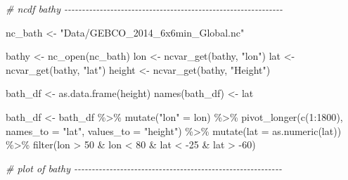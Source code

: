 \documentclass[
]{article}
\newenvironment{Shaded}{\begin{snugshade}}{\end{snugshade}}
\newcommand{\AttributeTok}[1]{\textcolor[rgb]{0.77,0.63,0.00}{#1}}
\newcommand{\CommentTok}[1]{\textcolor[rgb]{0.56,0.35,0.01}{\textit{#1}}}
\newcommand{\DecValTok}[1]{\textcolor[rgb]{0.00,0.00,0.81}{#1}}
\newcommand{\FunctionTok}[1]{\textcolor[rgb]{0.00,0.00,0.00}{#1}}
\newcommand{\NormalTok}[1]{#1}
\newcommand{\OtherTok}[1]{\textcolor[rgb]{0.56,0.35,0.01}{#1}}
\newcommand{\SpecialCharTok}[1]{\textcolor[rgb]{0.00,0.00,0.00}{#1}}
\newcommand{\StringTok}[1]{\textcolor[rgb]{0.31,0.60,0.02}{#1}}
\begin{document}
\begin{Shaded}
\begin{Highlighting}[]
\CommentTok{\# ncdf bathy {-}{-}{-}{-}{-}{-}{-}{-}{-}{-}{-}{-}{-}{-}{-}{-}{-}{-}{-}{-}{-}{-}{-}{-}{-}{-}{-}{-}{-}{-}{-}{-}{-}{-}{-}{-}{-}{-}{-}{-}{-}{-}{-}{-}{-}{-}{-}{-}{-}{-}{-}{-}{-}{-}{-}{-}{-}{-}{-}{-}{-}{-}}

\NormalTok{nc\_bath }\OtherTok{\textless{}{-}} \StringTok{"Data/GEBCO\_2014\_6x6min\_Global.nc"}

\NormalTok{bathy }\OtherTok{\textless{}{-}} \FunctionTok{nc\_open}\NormalTok{(nc\_bath)}
\NormalTok{lon }\OtherTok{\textless{}{-}} \FunctionTok{ncvar\_get}\NormalTok{(bathy, }\StringTok{"lon"}\NormalTok{)}
\NormalTok{lat }\OtherTok{\textless{}{-}} \FunctionTok{ncvar\_get}\NormalTok{(bathy, }\StringTok{"lat"}\NormalTok{)}
\NormalTok{height }\OtherTok{\textless{}{-}} \FunctionTok{ncvar\_get}\NormalTok{(bathy, }\StringTok{"Height"}\NormalTok{)}

\NormalTok{bath\_df }\OtherTok{\textless{}{-}} \FunctionTok{as.data.frame}\NormalTok{(height)}
\FunctionTok{names}\NormalTok{(bath\_df) }\OtherTok{\textless{}{-}}\NormalTok{ lat}

\NormalTok{bath\_df }\OtherTok{\textless{}{-}}\NormalTok{ bath\_df }\SpecialCharTok{\%\textgreater{}\%} \FunctionTok{mutate}\NormalTok{(}\StringTok{"lon"} \OtherTok{=}\NormalTok{ lon) }\SpecialCharTok{\%\textgreater{}\%}
  \FunctionTok{pivot\_longer}\NormalTok{(}\FunctionTok{c}\NormalTok{(}\DecValTok{1}\SpecialCharTok{:}\DecValTok{1800}\NormalTok{), }\AttributeTok{names\_to =} \StringTok{"lat"}\NormalTok{, }\AttributeTok{values\_to =} \StringTok{"height"}\NormalTok{) }\SpecialCharTok{\%\textgreater{}\%} 
  \FunctionTok{mutate}\NormalTok{(}\AttributeTok{lat =} \FunctionTok{as.numeric}\NormalTok{(lat)) }\SpecialCharTok{\%\textgreater{}\%} 
  \FunctionTok{filter}\NormalTok{(lon }\SpecialCharTok{\textgreater{}} \DecValTok{50} \SpecialCharTok{\&}\NormalTok{ lon }\SpecialCharTok{\textless{}} \DecValTok{80} \SpecialCharTok{\&}\NormalTok{ lat }\SpecialCharTok{\textless{}} \SpecialCharTok{{-}}\DecValTok{25} \SpecialCharTok{\&}\NormalTok{ lat }\SpecialCharTok{\textgreater{}} \SpecialCharTok{{-}}\DecValTok{60}\NormalTok{)}

\CommentTok{\# plot of bathy {-}{-}{-}{-}{-}{-}{-}{-}{-}{-}{-}{-}{-}{-}{-}{-}{-}{-}{-}{-}{-}{-}{-}{-}{-}{-}{-}{-}{-}{-}{-}{-}{-}{-}{-}{-}{-}{-}{-}{-}{-}{-}{-}{-}{-}{-}{-}{-}{-}{-}{-}{-}{-}{-}{-}{-}{-}{-}{-}}


\end{Highlighting}
\end{Shaded}
\end{document}
